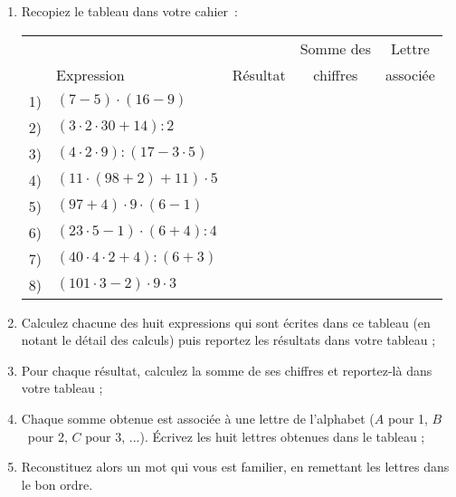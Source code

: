 
\begin{TP}


\begin{enumerate}
 \item Recopiez le tableau dans votre cahier :
 
 \begin{center}
 \begin{tabularx}{\linewidth}{|c|X|c|c|c|}
  \hline
  \rowcolor{A3}  &  &  & Somme des & Lettre \\
  \rowcolor{A3} \multirow{-2}{*}{Calcul \no} & \multirow{-2}{*}{Expression} & \multirow{-2}{*}{Résultat} &  chiffres & associée \\\hline
  \rowcolor{F3} 1) & $(7 - 5) \cdot (16 - 9)$ & & & \\\hline
  \rowcolor{A2} 2) & $(3 \cdot 2 \cdot 30 + 14) : 2$ & & & \\\hline
  \rowcolor{F3} 3) & $(4 \cdot 2 \cdot 9) : (17 - 3 \cdot 5)$ &  & &\\\hline
  \rowcolor{A2} 4) & $(11 \cdot (98 + 2) + 11) \cdot 5$ & &  & \\\hline
  \rowcolor{F3} 5) & $(97 + 4) \cdot 9 \cdot (6 - 1)$ & & &  \\\hline
  \rowcolor{A2} 6) & $(23 \cdot 5 - 1) \cdot (6 + 4) : 4$ & &  & \\\hline
  \rowcolor{F3} 7) & $(40 \cdot 4 \cdot 2 + 4) : (6 + 3)$ & &  &\\\hline
  \rowcolor{A2} 8) & $(101 \cdot 3 - 2) \cdot 9 \cdot 3$ & &  &\\\hline
  \end{tabularx}
\end{center}

 \item Calculez chacune des huit expressions qui sont écrites dans ce tableau (en notant le détail des calculs) puis reportez les résultats dans votre tableau ;
 \item Pour chaque résultat, calculez la somme de ses chiffres et reportez-là dans votre tableau ;
 \item Chaque somme obtenue est associée à une lettre de l'alphabet ($A$ pour 1, $B$ pour 2, $C$ pour 3, ...). Écrivez les huit lettres obtenues dans le tableau ;
 \item Reconstituez alors un mot qui vous est familier, en remettant les lettres dans le bon ordre.
\end{enumerate}


\end{TP}
